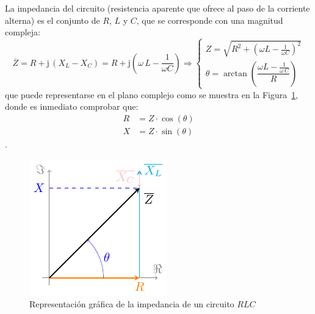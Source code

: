 \documentclass[11pt]{book} %
\begin{document}
	La impedancia del circuito (resistencia aparente que ofrece al paso de la corriente alterna) es el conjunto de $R$, $L$ y $C$, que se corresponde con una magnitud compleja: 
	\begin{equation}
		\boxed{ \overline{Z} = R + \mathrm{j}\,(X_L-X_C) = R+ \mathrm{j}\left(\omega\,L-\dfrac{1}{\omega C}\right) \Rightarrow 
			\begin{cases}
				Z=\sqrt{R^2+\left(\omega L -\frac{1}{\omega C} \right)^2}\\
				\theta=\arctan\left(\dfrac{\omega L-\frac{1}{\omega\,C}}{R} \right)
		\end{cases}}
	\end{equation}
	que puede representarse en el plano complejo como se muestra en la Figura~\ref{fig.fasorRLC}, donde es inmediato comprobar que:
	\begin{align*}
		R&=Z\cdot\cos(\theta)\\
		X&=Z\cdot\sin(\theta)
	\end{align*}. 
	\begin{figure}[htbp]
		\centering
		\includegraphics{../figs/fasorRLC.pdf}
		\caption{Representación gráfica de la impedancia de un circuito $RLC$}
		\label{fig.fasorRLC}
	\end{figure}
	
\end{document}
